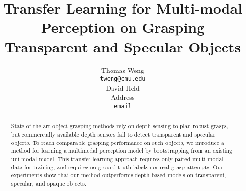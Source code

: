 \documentclass{article}
\title{Transfer Learning for Multi-modal Perception on Grasping Transparent and Specular Objects}
\author{
  Thomas Weng\\
  \texttt{tweng@cmu.edu} \\
  \AND
  David Held\\
  Address \\
  \texttt{email} \\
}
\begin{document}
\maketitle


\begin{abstract}
State-of-the-art object grasping methods rely on depth sensing to plan robust grasps, but commercially available depth sensors fail to detect transparent and specular objects.
To reach comparable grasping performance on such objects, we introduce a method for learning a multimodal perception model by bootstrapping from an existing uni-modal model. 
This transfer learning approach requires only paired multi-modal data for training, and requires no ground-truth labels nor real grasp attempts.
Our experiments show that our method outperforms depth-based models on transparent, specular, and opaque objects.
\end{abstract}






% 



	

\clearpage


\end{document}
